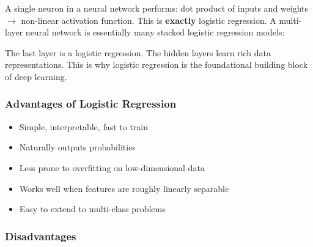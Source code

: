 \documentclass[12pt,openany]{book}
\begin{document}
A single neuron in a neural network performs: dot product of inputs and weights \(\rightarrow\) non-linear activation function. This is \textbf{exactly} logistic regression. A multi-layer neural network is essentially many stacked logistic regression models:


\begin{center}
\end{center}



The last layer is a logistic regression. The hidden layers learn rich data representations. This is why logistic regression is the foundational building block of deep learning.

\subsubsection{Advantages of Logistic Regression}


\begin{itemize}[leftmargin=*]
    \item Simple, interpretable, fast to train
    \item Naturally outputs probabilities
    \item Less prone to overfitting on low-dimensional data
    \item Works well when features are roughly linearly separable
    \item Easy to extend to multi-class problems

\end{itemize}

\subsubsection{Disadvantages}
\end{document}
